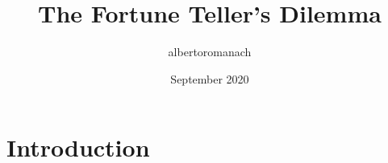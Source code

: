\documentclass{article}
\title{The Fortune Teller's Dilemma}
\author{albertoromanach }
\date{September 2020}
\begin{document}
\maketitle

\section{Introduction}
\end{document}
